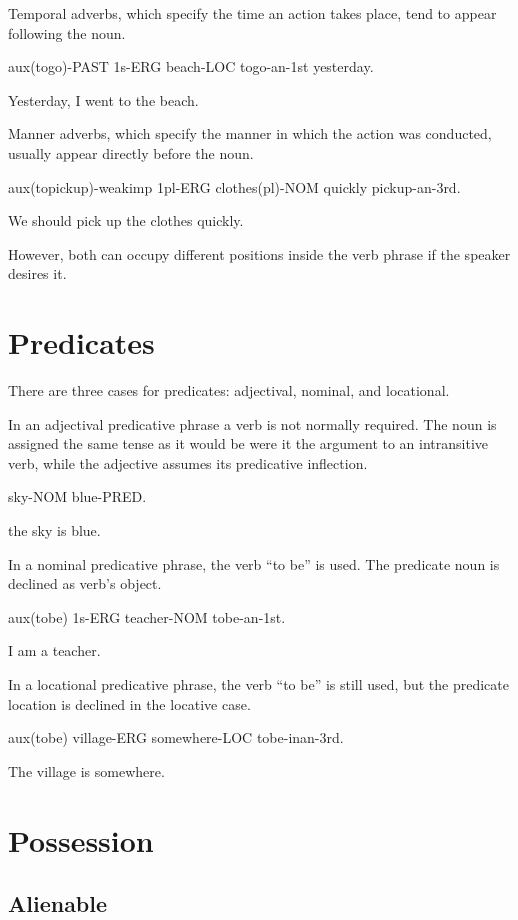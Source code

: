 Temporal adverbs, which specify the time an action takes place, tend to appear
following the noun.

aux(togo)-PAST 1s-ERG beach-LOC togo-an-1st yesterday.

Yesterday, I went to the beach.

Manner adverbs, which specify the manner in which the action was conducted,
usually appear directly before the noun.

aux(topickup)-weakimp 1pl-ERG clothes(pl)-NOM quickly pickup-an-3rd.

We should pick up the clothes quickly.

However, both can occupy different positions inside the verb phrase if the
speaker desires it.

\section{Predicates}

There are three cases for predicates: adjectival, nominal, and locational.

In an adjectival predicative phrase a verb is not normally required. The noun is
assigned the same tense as it would be were it the argument to an intransitive
verb, while the adjective assumes its predicative inflection.

sky-NOM blue-PRED.

the sky is blue.

In a nominal predicative phrase, the verb ``to be'' is used. The predicate noun
is declined as verb's object.

aux(tobe) 1s-ERG teacher-NOM tobe-an-1st.

I am a teacher.

In a locational predicative phrase, the verb ``to be'' is still used, but the
predicate location is declined in the locative case.

aux(tobe) village-ERG somewhere-LOC tobe-inan-3rd.

The village is somewhere.

\section{Possession}

\subsection{Alienable}

